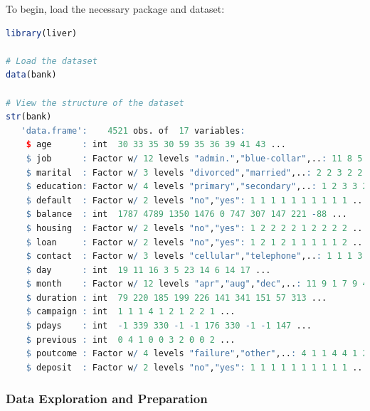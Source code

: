\documentclass[
]{book}
\theoremstyle{definition}
\theoremstyle{definition}
\theoremstyle{definition}
\theoremstyle{definition}
\theoremstyle{remark}
\begin{document}
To begin, load the necessary package and dataset:

\begin{lstlisting}[language=R]
library(liver)

# Load the dataset
data(bank)

# View the structure of the dataset
str(bank)
   'data.frame':    4521 obs. of  17 variables:
    $ age      : int  30 33 35 30 59 35 36 39 41 43 ...
    $ job      : Factor w/ 12 levels "admin.","blue-collar",..: 11 8 5 5 2 5 7 10 3 8 ...
    $ marital  : Factor w/ 3 levels "divorced","married",..: 2 2 3 2 2 3 2 2 2 2 ...
    $ education: Factor w/ 4 levels "primary","secondary",..: 1 2 3 3 2 3 3 2 3 1 ...
    $ default  : Factor w/ 2 levels "no","yes": 1 1 1 1 1 1 1 1 1 1 ...
    $ balance  : int  1787 4789 1350 1476 0 747 307 147 221 -88 ...
    $ housing  : Factor w/ 2 levels "no","yes": 1 2 2 2 2 1 2 2 2 2 ...
    $ loan     : Factor w/ 2 levels "no","yes": 1 2 1 2 1 1 1 1 1 2 ...
    $ contact  : Factor w/ 3 levels "cellular","telephone",..: 1 1 1 3 3 1 1 1 3 1 ...
    $ day      : int  19 11 16 3 5 23 14 6 14 17 ...
    $ month    : Factor w/ 12 levels "apr","aug","dec",..: 11 9 1 7 9 4 9 9 9 1 ...
    $ duration : int  79 220 185 199 226 141 341 151 57 313 ...
    $ campaign : int  1 1 1 4 1 2 1 2 2 1 ...
    $ pdays    : int  -1 339 330 -1 -1 176 330 -1 -1 147 ...
    $ previous : int  0 4 1 0 0 3 2 0 0 2 ...
    $ poutcome : Factor w/ 4 levels "failure","other",..: 4 1 1 4 4 1 2 4 4 1 ...
    $ deposit  : Factor w/ 2 levels "no","yes": 1 1 1 1 1 1 1 1 1 1 ...
\end{lstlisting}

\subsubsection*{Data Exploration and Preparation}\label{data-exploration-and-preparation}
\end{document}
